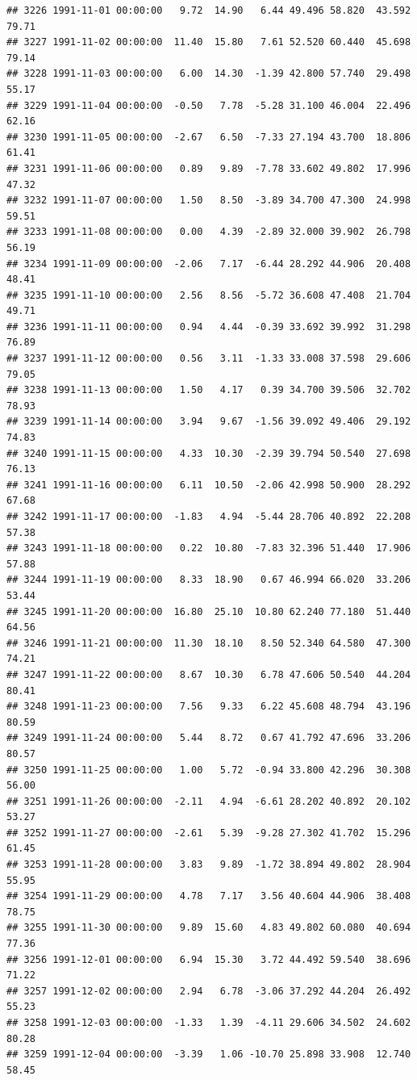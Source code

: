 \documentclass{article}\usepackage{graphicx, color}
\makeatletter
\newenvironment{kframe}{%
 \def\at@end@of@kframe{}%
 \ifinner\ifhmode%
  \def\at@end@of@kframe{\end{minipage}}%
  \begin{minipage}{\columnwidth}%
 \fi\fi%
 \def\FrameCommand##1{\hskip\@totalleftmargin \hskip-\fboxsep
 \colorbox{shadecolor}{##1}\hskip-\fboxsep
     \hskip-\linewidth \hskip-\@totalleftmargin \hskip\columnwidth}%
 \MakeFramed {\advance\hsize-\width
   \@totalleftmargin\z@ \linewidth\hsize
   \@setminipage}}%
 {\par\unskip\endMakeFramed%
 \at@end@of@kframe}
\newenvironment{knitrout}{}{} %
\makeatother
\begin{document}
\begin{knitrout}
\begin{kframe}
\begin{verbatim}
## 3226 1991-11-01 00:00:00   9.72  14.90   6.44 49.496 58.820  43.592  79.71
## 3227 1991-11-02 00:00:00  11.40  15.80   7.61 52.520 60.440  45.698  79.14
## 3228 1991-11-03 00:00:00   6.00  14.30  -1.39 42.800 57.740  29.498  55.17
## 3229 1991-11-04 00:00:00  -0.50   7.78  -5.28 31.100 46.004  22.496  62.16
## 3230 1991-11-05 00:00:00  -2.67   6.50  -7.33 27.194 43.700  18.806  61.41
## 3231 1991-11-06 00:00:00   0.89   9.89  -7.78 33.602 49.802  17.996  47.32
## 3232 1991-11-07 00:00:00   1.50   8.50  -3.89 34.700 47.300  24.998  59.51
## 3233 1991-11-08 00:00:00   0.00   4.39  -2.89 32.000 39.902  26.798  56.19
## 3234 1991-11-09 00:00:00  -2.06   7.17  -6.44 28.292 44.906  20.408  48.41
## 3235 1991-11-10 00:00:00   2.56   8.56  -5.72 36.608 47.408  21.704  49.71
## 3236 1991-11-11 00:00:00   0.94   4.44  -0.39 33.692 39.992  31.298  76.89
## 3237 1991-11-12 00:00:00   0.56   3.11  -1.33 33.008 37.598  29.606  79.05
## 3238 1991-11-13 00:00:00   1.50   4.17   0.39 34.700 39.506  32.702  78.93
## 3239 1991-11-14 00:00:00   3.94   9.67  -1.56 39.092 49.406  29.192  74.83
## 3240 1991-11-15 00:00:00   4.33  10.30  -2.39 39.794 50.540  27.698  76.13
## 3241 1991-11-16 00:00:00   6.11  10.50  -2.06 42.998 50.900  28.292  67.68
## 3242 1991-11-17 00:00:00  -1.83   4.94  -5.44 28.706 40.892  22.208  57.38
## 3243 1991-11-18 00:00:00   0.22  10.80  -7.83 32.396 51.440  17.906  57.88
## 3244 1991-11-19 00:00:00   8.33  18.90   0.67 46.994 66.020  33.206  53.44
## 3245 1991-11-20 00:00:00  16.80  25.10  10.80 62.240 77.180  51.440  64.56
## 3246 1991-11-21 00:00:00  11.30  18.10   8.50 52.340 64.580  47.300  74.21
## 3247 1991-11-22 00:00:00   8.67  10.30   6.78 47.606 50.540  44.204  80.41
## 3248 1991-11-23 00:00:00   7.56   9.33   6.22 45.608 48.794  43.196  80.59
## 3249 1991-11-24 00:00:00   5.44   8.72   0.67 41.792 47.696  33.206  80.57
## 3250 1991-11-25 00:00:00   1.00   5.72  -0.94 33.800 42.296  30.308  56.00
## 3251 1991-11-26 00:00:00  -2.11   4.94  -6.61 28.202 40.892  20.102  53.27
## 3252 1991-11-27 00:00:00  -2.61   5.39  -9.28 27.302 41.702  15.296  61.45
## 3253 1991-11-28 00:00:00   3.83   9.89  -1.72 38.894 49.802  28.904  55.95
## 3254 1991-11-29 00:00:00   4.78   7.17   3.56 40.604 44.906  38.408  78.75
## 3255 1991-11-30 00:00:00   9.89  15.60   4.83 49.802 60.080  40.694  77.36
## 3256 1991-12-01 00:00:00   6.94  15.30   3.72 44.492 59.540  38.696  71.22
## 3257 1991-12-02 00:00:00   2.94   6.78  -3.06 37.292 44.204  26.492  55.23
## 3258 1991-12-03 00:00:00  -1.33   1.39  -4.11 29.606 34.502  24.602  80.28
## 3259 1991-12-04 00:00:00  -3.39   1.06 -10.70 25.898 33.908  12.740  58.45

\end{verbatim}
\end{kframe}
\end{knitrout}
\end{document}

